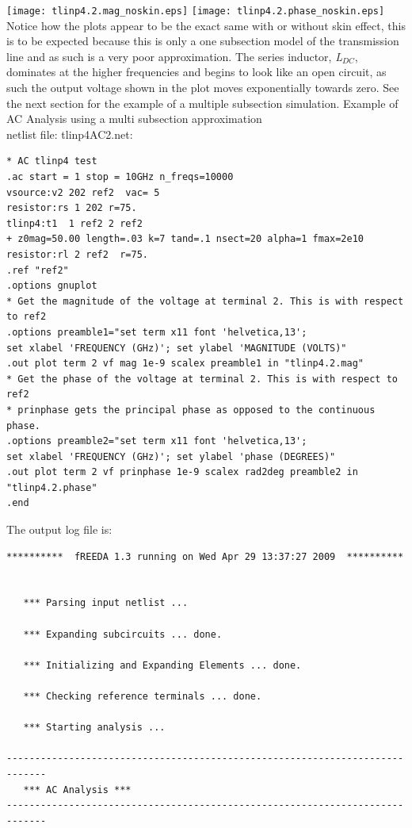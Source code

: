 \documentclass{article}
\begin{document}
{\newline
\texttt{[image: tlinp4.2.mag\_noskin.eps]}\hfill
\texttt{[image: tlinp4.2.phase\_noskin.eps]}\hspace*{\fill}
~\\
Notice how the plots appear to be the exact same with or without skin effect, this is to be expected because this is only a one subsection model of the transmission line and as such is a very poor approximation.  The series inductor, \emph{L$_{DC}$}, dominates at the higher frequencies and begins to look like an open circuit, as such the output voltage shown in the plot moves exponentially towards zero.  See the next section for the example of a multiple subsection simulation.
\myThickLine
\newline
Example of AC Analysis using a multi subsection approximation\\
netlist file: tlinp4AC2.net:
\begin{verbatim}
* AC tlinp4 test
.ac start = 1 stop = 10GHz n_freqs=10000
vsource:v2 202 ref2  vac= 5
resistor:rs 1 202 r=75.
tlinp4:t1  1 ref2 2 ref2
+ z0mag=50.00 length=.03 k=7 tand=.1 nsect=20 alpha=1 fmax=2e10
resistor:rl 2 ref2  r=75.
.ref "ref2"
.options gnuplot
* Get the magnitude of the voltage at terminal 2. This is with respect to ref2
.options preamble1="set term x11 font 'helvetica,13';
set xlabel 'FREQUENCY (GHz)'; set ylabel 'MAGNITUDE (VOLTS)"
.out plot term 2 vf mag 1e-9 scalex preamble1 in "tlinp4.2.mag"
* Get the phase of the voltage at terminal 2. This is with respect to ref2
* prinphase gets the principal phase as opposed to the continuous phase.
.options preamble2="set term x11 font 'helvetica,13';
set xlabel 'FREQUENCY (GHz)'; set ylabel 'phase (DEGREES)"
.out plot term 2 vf prinphase 1e-9 scalex rad2deg preamble2 in "tlinp4.2.phase"
.end
\end{verbatim}

The output log file is:
\begin{verbatim}
**********  fREEDA 1.3 running on Wed Apr 29 13:37:27 2009  **********


   *** Parsing input netlist ...

   *** Expanding subcircuits ... done.

   *** Initializing and Expanding Elements ... done.

   *** Checking reference terminals ... done.

   *** Starting analysis ...

-----------------------------------------------------------------------------
   *** AC Analysis ***
-----------------------------------------------------------------------------


\end{verbatim}}
\end{document}

